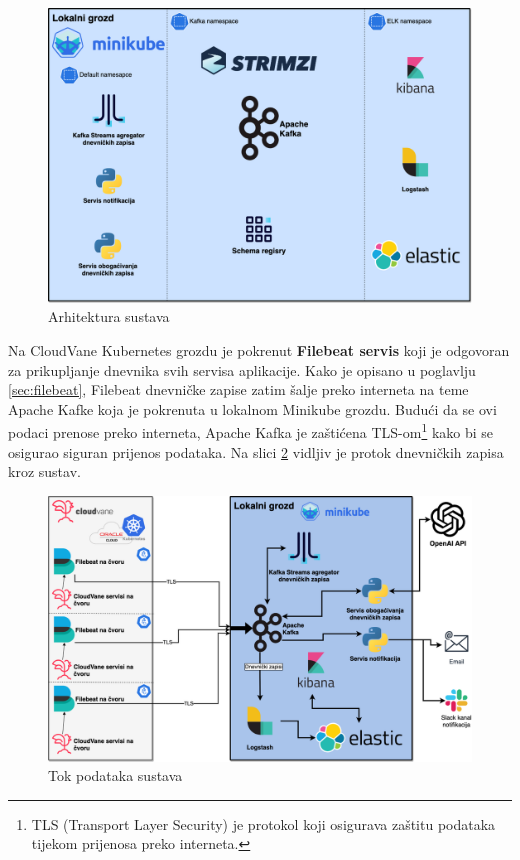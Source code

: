 \documentclass[times, utf8, diplomski]{fer}
\begin{document}
\begin{figure}[htb]
	\centering
	\includegraphics[width=15cm]{images/ThesisArchitecture.png}
	\caption[Arhitektura sustava]{Arhitektura sustava}
	\label{fig:archDiagram}
\end{figure}

Na CloudVane Kubernetes grozdu je pokrenut \textbf{Filebeat servis} koji je odgovoran za prikupljanje dnevnika svih servisa aplikacije. Kako je opisano u poglavlju \ref{sec:filebeat}, Filebeat dnevničke zapise zatim šalje preko interneta na teme Apache Kafke koja je pokrenuta u lokalnom Minikube grozdu. Budući da se ovi podaci prenose preko interneta, Apache Kafka je zaštićena TLS-om\footnote{TLS (Transport Layer Security) je protokol koji osigurava zaštitu podataka tijekom prijenosa preko interneta.} kako bi se osigurao siguran prijenos podataka. Na slici \ref{fig:dataDiagram} vidljiv je protok dnevničkih zapisa kroz sustav.

\begin{figure}[htb]
	\centering
	\includegraphics[width=15cm]{images/ThesisData.png}
	\caption[Tok podataka sustava]{Tok podataka  sustava}
	\label{fig:dataDiagram}
\end{figure}
\end{document}
